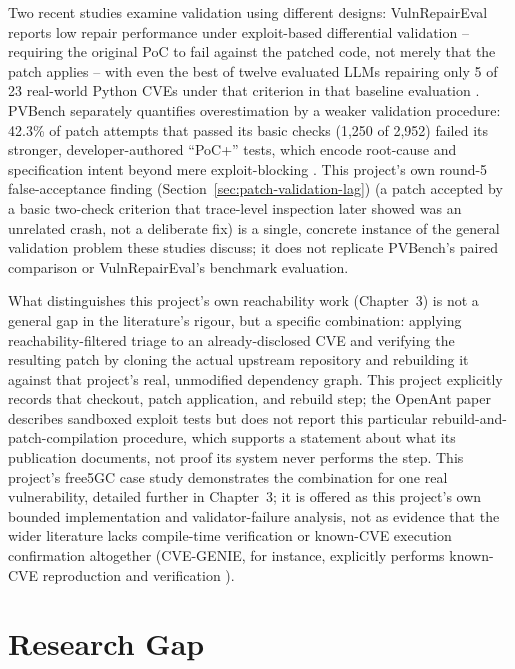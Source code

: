 \documentclass[12pt,a4paper]{report}
\begin{document}
Two recent studies examine validation using different designs: VulnRepairEval reports low repair performance under exploit-based differential validation -- requiring the original PoC to fail against the patched code, not merely that the patch applies -- with even the best of twelve evaluated LLMs repairing only 5 of 23 real-world Python CVEs under that criterion in that baseline evaluation \cite{vulnrepaireval}. PVBench separately quantifies overestimation by a weaker validation procedure: 42.3\% of patch attempts that passed its basic checks (1{,}250 of 2{,}952) failed its stronger, developer-authored ``PoC+'' tests, which encode root-cause and specification intent beyond mere exploit-blocking \cite{pvbench}. This project's own round-5 false-acceptance finding (Section~\ref{sec:patch-validation-lag}) (a patch accepted by a basic two-check criterion that trace-level inspection later showed was an unrelated crash, not a deliberate fix) is a single, concrete instance of the general validation problem these studies discuss; it does not replicate PVBench's paired comparison or VulnRepairEval's benchmark evaluation.

What distinguishes this project's own reachability work (Chapter~3) is not a general gap in the literature's rigour, but a specific combination: applying reachability-filtered triage to an already-disclosed CVE and verifying the resulting patch by cloning the actual upstream repository and rebuilding it against that project's real, unmodified dependency graph. This project explicitly records that checkout, patch application, and rebuild step; the OpenAnt paper describes sandboxed exploit tests but does not report this particular rebuild-and-patch-compilation procedure, which supports a statement about what its publication documents, not proof its system never performs the step. This project's free5GC case study demonstrates the combination for one real vulnerability, detailed further in Chapter~3; it is offered as this project's own bounded implementation and validator-failure analysis, not as evidence that the wider literature lacks compile-time verification or known-CVE execution confirmation altogether (CVE-GENIE, for instance, explicitly performs known-CVE reproduction and verification \cite{cvegenie}).

\section{Research Gap}
\end{document}
